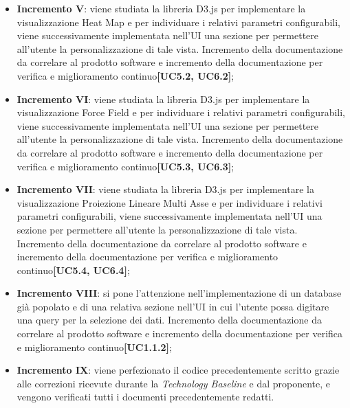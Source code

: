 \begin{itemize}
\begin{itemize}
	\item \textbf{Incremento V}: viene studiata la libreria D3.js per implementare la visualizzazione Heat Map e per individuare i relativi parametri configurabili, viene successivamente implementata nell'UI una sezione per permettere all'utente la personalizzazione di tale vista. Incremento della documentazione da correlare al prodotto software e incremento della documentazione per verifica e miglioramento continuo\textbf{[UC5.2, UC6.2]};
	
	\item \textbf{Incremento VI}: viene studiata la libreria D3.js per implementare la visualizzazione Force Field e per individuare i relativi parametri configurabili, viene successivamente implementata nell'UI una sezione per permettere all'utente la personalizzazione di tale vista. Incremento della documentazione da correlare al prodotto software e incremento della documentazione per verifica e miglioramento continuo\textbf{[UC5.3, UC6.3]};
	
	\item \textbf{Incremento VII}: viene studiata la libreria D3.js per implementare la visualizzazione Proiezione Lineare Multi Asse e per individuare i relativi parametri configurabili, viene successivamente implementata nell'UI una sezione per permettere all'utente la personalizzazione di tale vista. Incremento della documentazione da correlare al prodotto software e incremento della documentazione per verifica e miglioramento continuo\textbf{[UC5.4, UC6.4]};
	
	\item \textbf{Incremento VIII}: si pone l'attenzione nell'implementazione di un database già popolato e di una relativa sezione nell'UI in cui l'utente possa digitare una query per la selezione dei dati. Incremento della documentazione da correlare al prodotto software e incremento della documentazione per verifica e miglioramento continuo\textbf{[UC1.1.2]};
	
	\item \textbf{Incremento IX}: viene perfezionato il codice precedentemente scritto grazie alle correzioni ricevute durante la \textit{Technology Baseline} e dal proponente, e vengono verificati tutti i documenti precedentemente redatti.
	\end{itemize}
\end{itemize}

